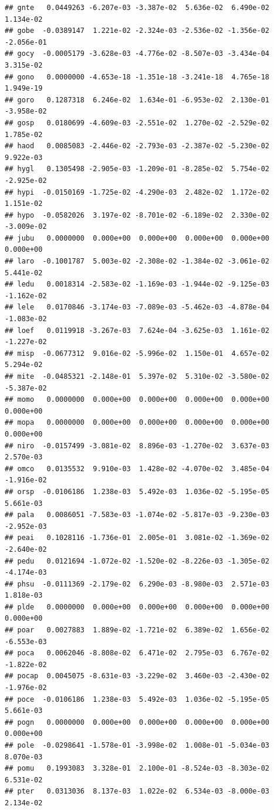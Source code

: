 \documentclass[
]{article}
\begin{document}
\begin{verbatim}
## gnte   0.0449263 -6.207e-03 -3.387e-02  5.636e-02  6.490e-02  1.134e-02
## gobe  -0.0389147  1.221e-02 -2.324e-03 -2.536e-02 -1.356e-02 -2.056e-01
## gocy  -0.0005179 -3.628e-03 -4.776e-02 -8.507e-03 -3.434e-04  3.315e-02
## gono   0.0000000 -4.653e-18 -1.351e-18 -3.241e-18  4.765e-18  1.949e-19
## goro   0.1287318  6.246e-02  1.634e-01 -6.953e-02  2.130e-01 -3.958e-02
## gosp   0.0180699 -4.609e-03 -2.551e-02  1.270e-02 -2.529e-02  1.785e-02
## haod   0.0085083 -2.446e-02 -2.793e-03 -2.387e-02 -5.230e-02  9.922e-03
## hygl   0.1305498 -2.905e-03 -1.209e-01 -8.285e-02  5.754e-02 -2.925e-02
## hypi  -0.0150169 -1.725e-02 -4.290e-03  2.482e-02  1.172e-02  1.151e-02
## hypo  -0.0582026  3.197e-02 -8.701e-02 -6.189e-02  2.330e-02 -3.009e-02
## jubu   0.0000000  0.000e+00  0.000e+00  0.000e+00  0.000e+00  0.000e+00
## laro  -0.1001787  5.003e-02 -2.308e-02 -1.384e-02 -3.061e-02  5.441e-02
## ledu   0.0018314 -2.583e-02 -1.169e-03 -1.944e-02 -9.125e-03 -1.162e-02
## lele   0.0170846 -3.174e-03 -7.089e-03 -5.462e-03 -4.878e-04 -1.083e-02
## loef   0.0119918 -3.267e-03  7.624e-04 -3.625e-03  1.161e-02 -1.227e-02
## misp  -0.0677312  9.016e-02 -5.996e-02  1.150e-01  4.657e-02  5.294e-02
## mite  -0.0485321 -2.148e-01  5.397e-02  5.310e-02 -3.580e-02 -5.387e-02
## momo   0.0000000  0.000e+00  0.000e+00  0.000e+00  0.000e+00  0.000e+00
## mopa   0.0000000  0.000e+00  0.000e+00  0.000e+00  0.000e+00  0.000e+00
## niro  -0.0157499 -3.081e-02  8.896e-03 -1.270e-02  3.637e-03  2.570e-03
## omco   0.0135532  9.910e-03  1.428e-02 -4.070e-02  3.485e-04 -1.916e-02
## orsp  -0.0106186  1.238e-03  5.492e-03  1.036e-02 -5.195e-05  5.661e-03
## pala   0.0086051 -7.583e-03 -1.074e-02 -5.817e-03 -9.230e-03 -2.952e-03
## peai   0.1028116 -1.736e-01  2.005e-01  3.081e-02 -1.369e-02 -2.640e-02
## pedu   0.0121694 -1.072e-02 -1.520e-02 -8.226e-03 -1.305e-02 -4.174e-03
## phsu  -0.0111369 -2.179e-02  6.290e-03 -8.980e-03  2.571e-03  1.818e-03
## plde   0.0000000  0.000e+00  0.000e+00  0.000e+00  0.000e+00  0.000e+00
## poar   0.0027883  1.889e-02 -1.721e-02  6.389e-02  1.656e-02 -6.553e-03
## poca   0.0062046 -8.808e-02  6.471e-02  2.795e-03  6.767e-02 -1.822e-02
## pocap  0.0045075 -8.631e-03 -3.229e-02  3.460e-03 -2.430e-02 -1.976e-02
## poce  -0.0106186  1.238e-03  5.492e-03  1.036e-02 -5.195e-05  5.661e-03
## pogn   0.0000000  0.000e+00  0.000e+00  0.000e+00  0.000e+00  0.000e+00
## pole  -0.0298641 -1.578e-01 -3.998e-02  1.008e-01 -5.034e-03  8.070e-03
## pomu   0.1993083  3.328e-01  2.100e-01 -8.524e-03 -8.303e-02  6.531e-02
## pter   0.0313036  8.137e-03  1.022e-02  6.534e-03 -8.000e-03  2.134e-02

\end{verbatim}
\end{document}
